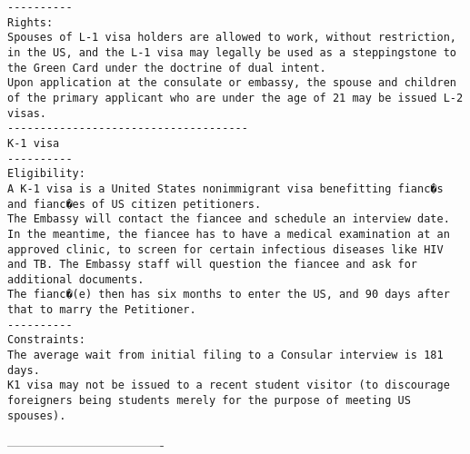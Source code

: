 \documentclass[oneside, article]{memoir}
\begin{document}
\begin{verbatim}
----------
Rights:
Spouses of L-1 visa holders are allowed to work, without restriction, in the US, and the L-1 visa may legally be used as a steppingstone to the Green Card under the doctrine of dual intent.
Upon application at the consulate or embassy, the spouse and children of the primary applicant who are under the age of 21 may be issued L-2 visas.
-------------------------------------
K-1 visa
----------
Eligibility:
A K-1 visa is a United States nonimmigrant visa benefitting fianc�s and fianc�es of US citizen petitioners.
The Embassy will contact the fiancee and schedule an interview date. In the meantime, the fiancee has to have a medical examination at an approved clinic, to screen for certain infectious diseases like HIV and TB. The Embassy staff will question the fiancee and ask for additional documents.
The fianc�(e) then has six months to enter the US, and 90 days after that to marry the Petitioner.
----------
Constraints:
The average wait from initial filing to a Consular interview is 181 days.
K1 visa may not be issued to a recent student visitor (to discourage foreigners being students merely for the purpose of meeting US spouses).
\end{verbatim}
-------------------------------------
\end{document}
